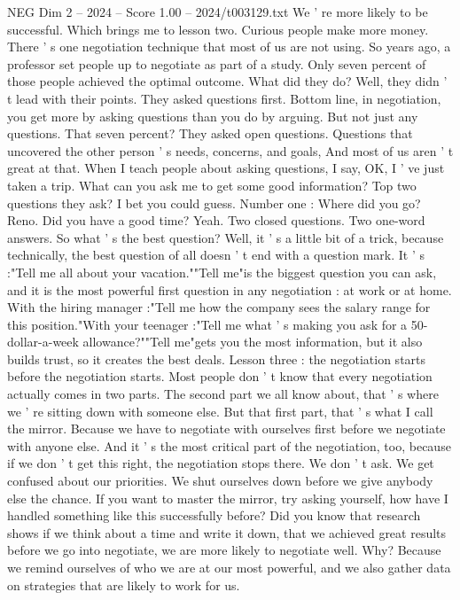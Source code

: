 \begin{textsample}{NEG Dim 2 – 2024 – Score 1.00 – 2024/t003129.txt}
We ' re more likely to be successful.
Which brings me to lesson two.
Curious people make more money.
There ' s one negotiation technique that most of us are not using.
So years ago, a professor set people up to negotiate as part of a study.
Only seven percent of those people achieved the optimal outcome.
What did they do?
Well, they didn ' t lead with their points.
They asked questions first.
Bottom line, in negotiation, you get more by asking questions than you do by arguing.
But not just any questions.
That seven percent?
They asked open questions.
Questions that uncovered the other person ' s needs, concerns, and goals, And most of us aren ' t great at that.
When I teach people about asking questions, I say, OK, I ' ve just taken a trip.
What can you ask me to get some good information?
Top two questions they ask?
I bet you could guess.
Number one : Where did you go?
Reno.
Did you have a good time?
Yeah.
Two closed questions.
Two one-word answers.
So what ' s the best question?
Well, it ' s a little bit of a trick, because technically, the best question of all doesn ' t end with a question mark.
It ' s :"Tell me all about your vacation.""Tell me"is the biggest question you can ask, and it is the most powerful first question in any negotiation : at work or at home.
With the hiring manager :"Tell me how the company sees the salary range for this position."With your teenager :"Tell me what ' s making you ask for a 50-dollar-a-week allowance?""Tell me"gets you the most information, but it also builds trust, so it creates the best deals.
Lesson three : the negotiation starts before the negotiation starts.
Most people don ' t know that every negotiation actually comes in two parts.
The second part we all know about, that ' s where we ' re sitting down with someone else.
But that first part, that ' s what I call the mirror.
Because we have to negotiate with ourselves first before we negotiate with anyone else.
And it ' s the most critical part of the negotiation, too, because if we don ' t get this right, the negotiation stops there.
We don ' t ask.
We get confused about our priorities.
We shut ourselves down before we give anybody else the chance.
If you want to master the mirror, try asking yourself, how have I handled something like this successfully before?
Did you know that research shows if we think about a time and write it down, that we achieved great results before we go into negotiate, we are more likely to negotiate well.
Why?
Because we remind ourselves of who we are at our most powerful, and we also gather data on strategies that are likely to work for us.

\end{textsample}
